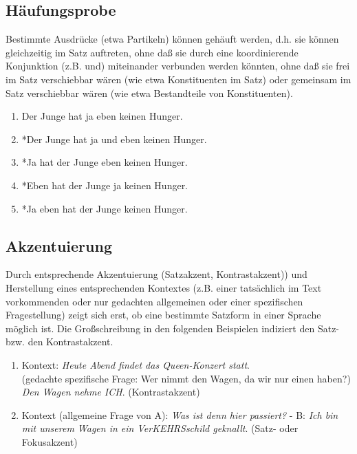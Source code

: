 \documentclass[
  letterpaper,
  DIV=11,
  numbers=noendperiod]{scrreprt}
\providecommand{\tightlist}{%
  \setlength{\itemsep}{0pt}\setlength{\parskip}{0pt}}\usepackage{longtable,booktabs,array}
\begin{document}
\hypertarget{huxe4ufungsprobe}{%
\subsection{Häufungsprobe}\label{huxe4ufungsprobe}}

Bestimmte Ausdrücke (etwa Partikeln) können gehäuft werden, d.h. sie
können gleichzeitig im Satz auftreten, ohne daß sie durch eine
koordinierende Konjunktion (z.B. und) miteinander verbunden werden
könnten, ohne daß sie frei im Satz verschiebbar wären (wie etwa
Konstituenten im Satz) oder gemeinsam im Satz verschiebbar wären (wie
etwa Bestandteile von Konstituenten).

\begin{enumerate}
\def\labelenumi{(\arabic{enumi})}
\tightlist
\item
  Der Junge hat ja eben keinen Hunger.\\
\item
  *Der Junge hat ja und eben keinen Hunger.\\
\item
  *Ja hat der Junge eben keinen Hunger.\\
\item
  *Eben hat der Junge ja keinen Hunger.\\
\item
  *Ja eben hat der Junge keinen Hunger.
\end{enumerate}

\hypertarget{akzentuierung}{%
\subsection{Akzentuierung}\label{akzentuierung}}

Durch entsprechende Akzentuierung (Satzakzent, Kontrastakzent)) und
Herstellung eines entsprechenden Kontextes (z.B. einer tatsächlich im
Text vorkommenden oder nur gedachten allgemeinen oder einer spezifischen
Fragestellung) zeigt sich erst, ob eine bestimmte Satzform in einer
Sprache möglich ist. Die Großschreibung in den folgenden Beispielen
indiziert den Satz- bzw. den Kontrastakzent.

\begin{enumerate}
\def\labelenumi{(\arabic{enumi})}
\tightlist
\item
  Kontext: \emph{Heute Abend findet das Queen-Konzert statt}.\\
  (gedachte spezifische Frage: Wer nimmt den Wagen, da wir nur einen
  haben?) \emph{Den Wagen nehme ICH}. (Kontrastakzent)\\
\item
  Kontext (allgemeine Frage von A): \emph{Was ist denn hier passiert?} -
  B: \emph{Ich bin mit unserem Wagen in ein VerKEHRSschild geknallt}.
  (Satz- oder Fokusakzent)
\end{enumerate}
\end{document}
